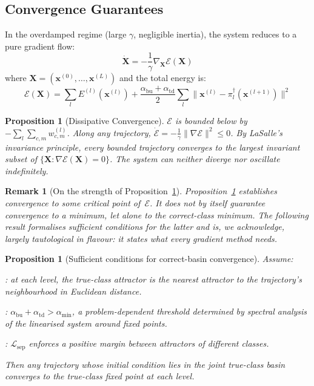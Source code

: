 \documentclass[11pt,a4paper]{article}
\newtheorem{proposition}[theorem]{Proposition}
\newtheorem{remark}[theorem]{Remark}
\begin{document}
\subsection{Convergence Guarantees}
\label{sec:theory:convergence}

In the overdamped regime (large $\gamma$, negligible inertia), the system reduces to a pure
gradient flow:
\begin{equation}
  \dot{\mathbf{X}} = -\frac{1}{\gamma}\nabla_{\mathbf{X}} \mathcal{E}(\mathbf{X})
\end{equation}
where $\mathbf{X} = (\mathbf{x}^{(0)}, \ldots, \mathbf{x}^{(L)})$ and the total energy is:
\begin{equation}
  \mathcal{E}(\mathbf{X}) = \sum_l E^{(l)}(\mathbf{x}^{(l)})
  + \frac{\alpha_{\mathrm{bu}} + \alpha_{\mathrm{td}}}{2}
    \sum_l \|\mathbf{x}^{(l)} - \pi_l^\dagger(\mathbf{x}^{(l+1)})\|^2
\label{eq:lyapunov}
\end{equation}

\begin{proposition}[Dissipative Convergence]
\label{prop:convergence}
$\mathcal{E}$ is bounded below by $-\sum_l \sum_{c,m} w^{(l)}_{c,m}$. Along any trajectory,
$\dot{\mathcal{E}} = -\frac{1}{\gamma}\|\nabla \mathcal{E}\|^2 \le 0$.
By LaSalle's invariance principle, every bounded trajectory converges to the largest
invariant subset of $\{\mathbf{X} : \nabla \mathcal{E}(\mathbf{X}) = 0\}$. The system can
neither diverge nor oscillate indefinitely.
\end{proposition}

\begin{remark}[On the strength of Proposition~\ref{prop:convergence}]
Proposition~\ref{prop:convergence} establishes convergence to \emph{some} critical point
of~$\mathcal{E}$. It does not by itself guarantee convergence to a \emph{minimum},
let alone to the \emph{correct-class} minimum. The following result formalises sufficient
conditions for the latter and is, we acknowledge, largely tautological in flavour: it
states what every gradient method needs.
\end{remark}

\begin{proposition}[Sufficient conditions for correct-basin convergence]
\label{prop:correct_basin}
Assume:
\begin{description}[leftmargin=2.5em]
  \item[C1 -- Local dominance]: at each level, the true-class attractor is the nearest
        attractor to the trajectory's neighbourhood in Euclidean distance.
  \item[C2 -- Sufficient coupling]:
        $\alpha_{\mathrm{bu}} + \alpha_{\mathrm{td}} > \alpha_{\min}$,
        a problem-dependent threshold determined by spectral analysis of the linearised
        system around fixed points.
  \item[C3 -- Basin separation]: $\mathcal{L}_{\mathrm{sep}}$ enforces a positive margin
        between attractors of different classes.
\end{description}
Then any trajectory whose initial condition lies in the joint true-class basin converges
to the true-class fixed point at each level.
\end{proposition}
\end{document}

